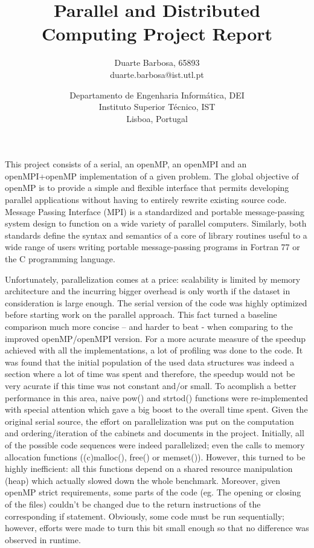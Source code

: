 \documentclass[times, 10pt,twocolumn]{article}
\begin{document}
\title{Parallel and Distributed Computing Project Report}

\author{
Duarte Barbosa, 65893\\
duarte.barbosa@ist.utl.pt\\
\and
Departamento de Engenharia Informática, DEI\\
Instituto Superior Técnico, IST\\
Lisboa, Portugal\\
}

\maketitle
\thispagestyle{empty}

This project consists of a serial, an openMP, an openMPI and an openMPI+openMP implementation of a given problem. The global objective of openMP is to provide a simple and flexible interface that permits developing parallel applications without having to entirely rewrite existing source code. Message Passing Interface (MPI) is a standardized and portable message-passing system design to function on a wide variety of parallel computers. Similarly, both standards define the syntax and semantics of a core of library routines useful to a wide range of users writing portable message-passing programs in Fortran 77 or the C programming language.

	Unfortunately, parallelization comes at a price: scalability is limited by memory architecture and the incurring bigger overhead is only worth if the dataset in consideration is large enough. The serial version of the code was highly optimized before starting work on the parallel approach. This fact turned a baseline comparison much more concise – and harder to beat - when comparing to the improved openMP/openMPI version.
	For a more acurate measure of the speedup achieved with all the implementations, a lot of profiling was done to the code. It was found that the initial population of the used data structures was indeed a section where a lot of time was spent and therefore, the speedup would not be very acurate if this time was not constant and/or small. To acomplish a better performance in this area, naive pow() and strtod() functions were re-implemented with special attention which gave a big boost to the overall time spent.
Given the original serial source, the effort on parallelization was put on the computation and ordering/iteration of the cabinets and documents in the project.
	Initially, all of the possible code sequences were indeed parallelized; even the calls to memory allocation functions ((c)malloc(), free() or memset()). However, this turned to be highly inefficient: all this functions depend on a shared resource manipulation (heap) which actually slowed down the whole benchmark. Moreover, given openMP strict requirements, some parts of the code (eg. The opening or closing of the files) couldn't be changed due to the return instructions of the corresponding if statement. Obviously, some code must be run sequentially; however, efforts were made to turn this bit small enough so that no difference was observed in runtime.
\end{document}
